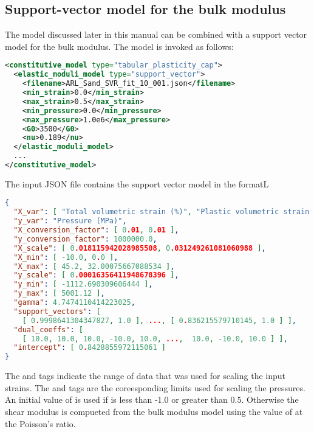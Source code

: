 \subsection{Support-vector model for the bulk modulus}
The  model discussed later in this manual can be
combined with a support vector model for the bulk modulus.  The model
is invoked as follows:
\begin{lstlisting}[language=XML]
<constitutive_model type="tabular_plasticity_cap">
  <elastic_moduli_model type="support_vector">
    <filename>ARL_Sand_SVR_fit_10_001.json</filename>
    <min_strain>0.0</min_strain>
    <max_strain>0.5</max_strain>
    <min_pressure>0.0</min_pressure>
    <max_pressure>1.0e6</max_pressure>
    <G0>3500</G0>
    <nu>0.189</nu>
  </elastic_moduli_model>
  ...
</constitutive_model>
\end{lstlisting}
The input JSON file contains the support vector model in the formatL
\begin{lstlisting}[language=JSON]
{
  "X_var": [ "Total volumetric strain (%)", "Plastic volumetric strain (%)" ],
  "y_var": "Pressure (MPa)",
  "X_conversion_factor": [ 0.01, 0.01 ],
  "y_conversion_factor": 1000000.0,
  "X_scale": [ 0.018115942028985508, 0.031249261081060988 ],
  "X_min": [ -10.0, 0.0 ],
  "X_max": [ 45.2, 32.00075667088534 ],
  "y_scale": [ 0.00016356411948678396 ],
  "y_min": [ -1112.690309606444 ],
  "y_max": [ 5001.12 ],
  "gamma": 4.7474110414223025,
  "support_vectors": [
    [ 0.9998641304347827, 1.0 ], ..., [ 0.836215579710145, 1.0 ] ],
  "dual_coeffs": [
    [ 10.0, 10.0, 10.0, -10.0, 10.0, ...,  10.0, -10.0, 10.0 ] ],
  "intercept": [ 0.8428855972115061 ]
}
\end{lstlisting}
The  and  tags indicate the range of data
that was used for scaling the input strains.  The  and 
tags are the coreesponding limits used for scaling the pressures.  An initial value of 
is used if  is less than -1.0 or greater than 0.5.  Otherwise the shear modulus is 
compueted from the bulk modulus model using the value of  at the Poisson's ratio.

